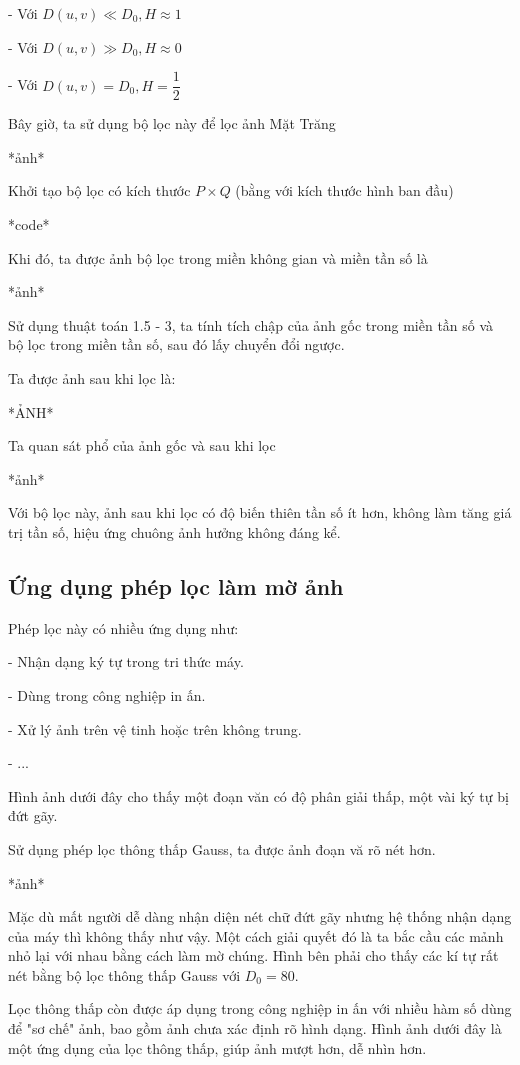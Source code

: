 \documentclass[12pt,a4paper]{report}
\numberwithin{equation}{section}
\theoremstyle{definition} %
\begin{document}
- Với $D(u,v) \ll D_0, H\approx 1$

- Với $D(u,v) \gg D_0, H\approx 0$

- Với $D(u,v) = D_0, H= \dfrac{1}{2}$

Bây giờ, ta sử dụng bộ lọc này để lọc ảnh Mặt Trăng

*ảnh*

Khởi tạo bộ lọc có kích thước $P \times Q$ (bằng với kích thước hình ban đầu)

*code*

Khi đó, ta được ảnh bộ lọc trong miền không gian và miền tần số là 

*ảnh*

Sử dụng thuật toán 1.5 - 3, ta tính tích chập của ảnh gốc trong miền tần số và bộ lọc trong miền tần số, sau đó lấy chuyển đổi ngược.

Ta được ảnh sau khi lọc là:

*ẢNH*

Ta quan sát phổ của ảnh gốc và sau khi lọc 

*ảnh*

Với bộ lọc này, ảnh sau khi lọc có độ biến thiên tần số ít hơn, không làm tăng giá trị tần số, hiệu ứng chuông ảnh hưởng không đáng kể. 



\subsection{Ứng dụng phép lọc làm mờ ảnh}

Phép lọc này có nhiều ứng dụng như:

- Nhận dạng ký tự trong tri thức máy.

- Dùng trong công nghiệp in ấn.

- Xử lý ảnh trên vệ tinh hoặc trên không trung.

- ...

Hình ảnh dưới đây cho thấy một đoạn văn có độ phân giải thấp, một vài ký tự bị đứt gãy. 

Sử dụng phép lọc thông thấp Gauss, ta được ảnh đoạn vă rõ nét hơn.

*ảnh*

Mặc dù mất người dễ dàng nhận diện nét chữ đứt gãy nhưng hệ thống nhận dạng của máy thì không thấy như vậy. Một cách giải quyết đó là ta bắc cầu các mảnh nhỏ lại với nhau bằng cách làm mờ chúng. Hình bên phải cho thấy các kí tự rất nét bằng bộ lọc thông thấp Gauss với $D_0 = 80$.

Lọc thông thấp còn được áp dụng trong công nghiệp in ấn với nhiều hàm số dùng để "sơ chế" ảnh, bao gồm ảnh chưa xác định rõ hình dạng. Hình ảnh dưới đây là một ứng dụng của lọc thông thấp, giúp ảnh mượt hơn, dễ nhìn hơn.
\end{document}
